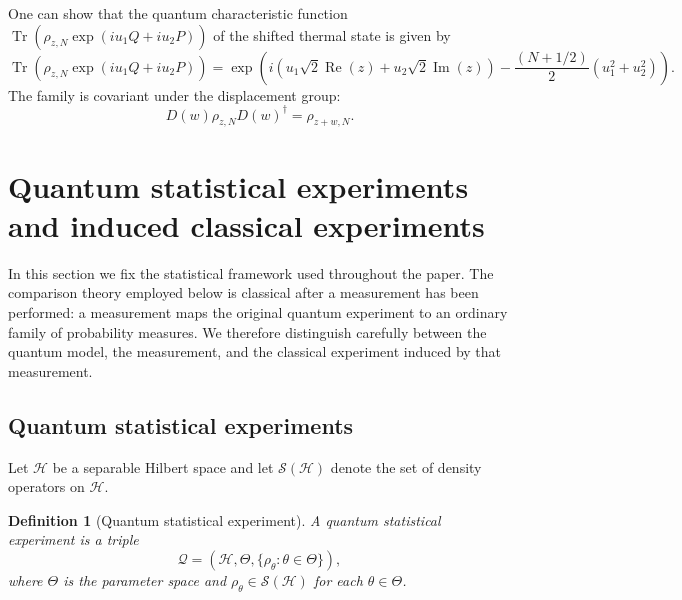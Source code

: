 \documentclass{article}
\newtheorem{definition}{Definition}
\theoremstyle{named}
\theoremstyle{named1}
\newcommand{\Tr}{\operatorname{Tr}}
\newcommand{\Ree}{\operatorname{Re}}
\newcommand{\Img}{\operatorname{Im}}
\newcommand{\cQ}{\mathcal Q}
\newcommand{\cH}{\mathcal H}
\theoremstyle{plain}
\theoremstyle{remark}
\begin{document}
One can show that the quantum characteristic function $\Tr(\rho_{z,N}\exp(iu_1Q+iu_2P))$ of the shifted thermal state is given by
\[
\Tr(\rho_{z,N}\exp(iu_1Q+iu_2P))=\exp(i(u_1\sqrt{2}\Ree(z)+u_2\sqrt{2}\Img(z))-\frac{(N+1/2)}{2}(u_1^2+u_2^2)).
\]
The family is covariant under the displacement group:
\begin{equation}
    D(w)\rho_{z,N}D(w)^\dagger
    =
    \rho_{z+w,N}
    \label{eq:displacement-covariance}.
\end{equation}























\section{Quantum statistical experiments and induced classical experiments}
\label{sec:exp_n_suff}

In this section we fix the statistical framework used throughout the paper. The comparison theory employed below is classical after a measurement has been performed: a measurement maps the original quantum experiment to an ordinary family of probability measures. We therefore distinguish carefully between the quantum model, the measurement, and the classical experiment induced by that measurement.

\subsection{Quantum statistical experiments}

Let $\cH$ be a separable Hilbert space and let $\mathcal S(\cH)$ denote the set of density operators on $\cH$. %

\begin{definition}[Quantum statistical experiment]
A quantum statistical experiment is a triple
\[
    \cQ=(\cH,\Theta,\{\rho_\theta:\theta\in\Theta\}),
\]
where $\Theta$ is the parameter space and $\rho_\theta\in\mathcal S(\cH)$ for each
$\theta\in\Theta$.
\end{definition}
\end{document}
